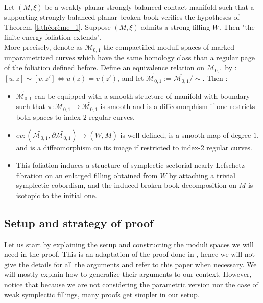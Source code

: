 \documentclass[../main.tex]{subfiles}
\begin{document}
\begin{theorem}\label{t:filling}
    Let $(M,\xi)$ be a weakly planar strongly balanced contact manifold such that a supporting strongly balanced planar broken book verifies the hypotheses of Theorem \ref{t:théorème_1}. Suppose $(M,\xi)$ admits a strong filling $W$. Then "the finite energy foliation extends". \\
    More precisely, denote as $\overline{\mathcal{M}_{0,1}}$ the compactified moduli spaces of marked unparametrized curves which have the same homology class than a regular page of the foliation defined before. Define an equivalence relation on $\overline{\mathcal{M}_{0,1}}$ by : $[u,z]\sim [v,z'] \Leftrightarrow u(z) = v(z')$, and let $\widetilde{\mathcal{M}_{0,1}} :=\overline{\mathcal{M}_{0,1}}/\sim$. Then :
    \begin{itemize}
        \item $\widetilde{\mathcal{M}_{0,1}}$ can be equipped with a smooth structure of manifold with boundary such that $\pi : \overline{\mathcal{M}_{0,1}} \rightarrow \widetilde{\mathcal{M}_{0,1}} $ is smooth and is a diffeomorphism if one restricts both spaces to index-$2$ regular curves.
        \item $ev : (\widetilde{\mathcal{M}_{0,1}},\partial \widetilde{\mathcal{M}_{0,1}}) \rightarrow (\overline{W},M)$ is well-defined, is a smooth map of degree $1$, and is a diffeomorphism on its image if restricted to index-2 regular curves.
        \item This foliation induces a structure of symplectic sectorial nearly Lefschetz fibration on an enlarged filling obtained from $W$ by attaching a trivial symplectic cobordism, and the induced broken book decomposition on $M$ is isotopic to the initial one.
    \end{itemize}
\end{theorem}



\subsection{Setup and strategy of proof}

Let us start by explaining the setup and constructing the moduli spaces we will need in the proof. This is an adaptation of the proof done in \cite{SOBD2}, hence we will not give the details for all the arguments and refer to this paper when necessary. We will mostly explain how to generalize their arguments to our context. However, notice that because we are not considering the parametric version nor the case of weak symplectic fillings, many proofs get simpler in our setup. \\
\end{document}
